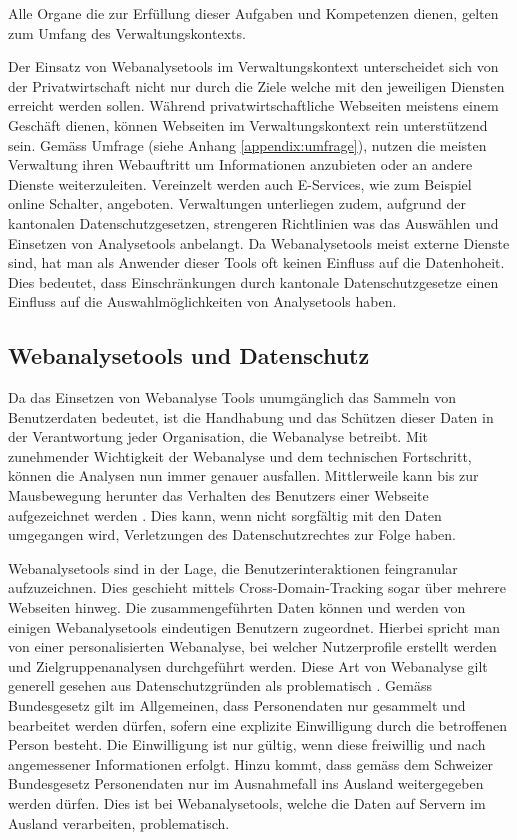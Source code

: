 Alle Organe die zur Erfüllung dieser Aufgaben und Kompetenzen dienen, gelten zum Umfang des Verwaltungskontexts.

Der Einsatz von Webanalysetools im Verwaltungskontext unterscheidet sich von der Privatwirtschaft nicht nur durch die Ziele welche mit den jeweiligen Diensten erreicht werden sollen. Während privatwirtschaftliche Webseiten meistens einem Geschäft dienen, können Webseiten im Verwaltungskontext rein unterstützend sein. Gemäss Umfrage (siehe Anhang \ref{appendix:umfrage}), nutzen die meisten Verwaltung ihren Webauftritt um Informationen anzubieten oder an andere Dienste weiterzuleiten. Vereinzelt werden auch E-Services, wie zum Beispiel online Schalter, angeboten. Verwaltungen unterliegen zudem, aufgrund der kantonalen Datenschutzgesetzen, strengeren Richtlinien was das Auswählen und Einsetzen von Analysetools anbelangt. Da Webanalysetools meist externe Dienste sind, hat man als Anwender dieser Tools oft keinen Einfluss auf die Datenhoheit. Dies bedeutet, dass Einschränkungen durch kantonale Datenschutzgesetze einen Einfluss auf die Auswahlmöglichkeiten von Analysetools haben.

\subsection{Webanalysetools und Datenschutz}
Da das Einsetzen von Webanalyse Tools unumgänglich das Sammeln von Benutzerdaten bedeutet, ist die Handhabung und das Schützen dieser Daten in der Verantwortung jeder Organisation, die Webanalyse betreibt. Mit zunehmender Wichtigkeit der Webanalyse und dem technischen Fortschritt, können die Analysen nun immer genauer ausfallen. Mittlerweile kann bis zur Mausbewegung herunter das Verhalten des Benutzers einer Webseite aufgezeichnet werden \parencite[S. 1]{EcommerceUndDatenschutz}. Dies kann, wenn nicht sorgfältig mit den Daten umgegangen wird, Verletzungen des Datenschutzrechtes zur Folge haben.

Webanalysetools sind in der Lage, die Benutzerinteraktionen feingranular aufzuzeichnen. Dies geschieht mittels Cross-Domain-Tracking sogar über mehrere Webseiten hinweg. Die zusammengeführten Daten können und werden von einigen Webanalysetools eindeutigen Benutzern zugeordnet. Hierbei spricht man von einer personalisierten Webanalyse, bei welcher Nutzerprofile erstellt werden und Zielgruppenanalysen durchgeführt werden. Diese Art von Webanalyse gilt generell gesehen aus Datenschutzgründen als problematisch \parencite[S. 2]{EcommerceUndDatenschutz}. Gemäss Bundesgesetz \parencite[§§ 4 Abs. 5]{SDSG} gilt im Allgemeinen, dass Personendaten nur gesammelt und bearbeitet werden dürfen, sofern eine explizite Einwilligung durch die betroffenen Person besteht. Die Einwilligung ist nur gültig, wenn diese freiwillig und nach angemessener Informationen erfolgt. Hinzu kommt, dass gemäss dem Schweizer Bundesgesetz \parencite[§§ 6 Abs. 1]{SDSG} Personendaten nur im Ausnahmefall ins Ausland weitergegeben werden dürfen. Dies ist bei Webanalysetools, welche die Daten auf Servern im Ausland verarbeiten, problematisch.

